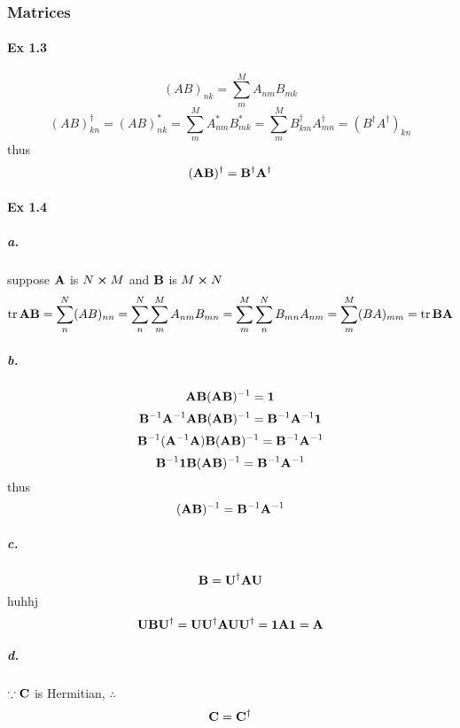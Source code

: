 \documentclass[a4paper]{article}
\newcommand{\ex}[1]{\paragraph{Ex #1}}
\newcommand{\subex}[1]{\subparagraph{#1}}
\newcommand{\iden}{{\large \bm{1}}}
\numberwithin{equation}{section}
\begin{document}
\subsubsection{Matrices}
\ex{1.3}
\begin{equation}\label{key}
(AB)_{nk} = \sum_m^M A_{nm}B_{mk}
\end{equation}
\begin{equation}\label{key}
(AB)^\dagger_{kn} = (AB)_{nk}^* = \sum_m^M A_{nm}^*B_{mk}^* = \sum_m^M B^\dagger_{km} A^\dagger_{mn} = (B^\dagger A^\dagger)_{kn}
\end{equation}
thus
\begin{equation}\label{key}
(\vb{A}\vb{B})^\dagger = \vb{B}^\dagger \vb{A}^\dagger
\end{equation}

\ex{1.4}
\subex{a.}
suppose $ \vb{A} $ is $ N\cross M $ and $ \vb{B} $ is $ M\cross N $
\begin{equation}\label{key}
\tr \vb{A}\vb{B} = \sum_n^N (AB)_{nn} = \sum_n^N \sum_m^M A_{nm}B_{mn} = \sum_m^M\sum_n^N  B_{mn}A_{nm} = \sum_m^M (BA)_{mm} = \tr \vb{B}\vb{A}
\end{equation}
\subex{b.}
\begin{equation}\label{key}
\vb{AB}(\vb{AB})^{-1} = \iden
\end{equation}
\begin{equation}\label{key}
\vb{B}^{-1}\vb{A}^{-1}\vb{A}\vb{B}(\vb{AB})^{-1} = \vb{B}^{-1}\vb{A}^{-1}\iden
\end{equation}
\begin{equation}\label{key}
\vb{B}^{-1}(\vb{A}^{-1}\vb{A})\vb{B}(\vb{AB})^{-1} = \vb{B}^{-1}\vb{A}^{-1}
\end{equation}
\begin{equation}\label{key}
\vb{B}^{-1} \iden \vb{B}(\vb{AB})^{-1} = \vb{B}^{-1}\vb{A}^{-1}
\end{equation}
thus
\begin{equation}\label{key}
(\vb{AB})^{-1} = \vb{B}^{-1}\vb{A}^{-1}
\end{equation}
\subex{c.}
\begin{equation}\label{key}
\vb{B} = \vb{U}^\dagger \vb{A} \vb{U}
\end{equation}huhhj
\begin{equation}\label{key}
\vb{U} \vb{B} \vb{U}^\dagger = \vb{U} \vb{U}^\dagger \vb{A} \vb{U} \vb{U}^\dagger = \iden \vb{A} \iden = \vb{A}
\end{equation}
\subex{d.}
$ \because \vb{C}$ is Hermitian, $ \therefore $
\begin{equation}\label{key}
\vb{C} = \vb{C}^\dagger
\end{equation}
\end{document}
